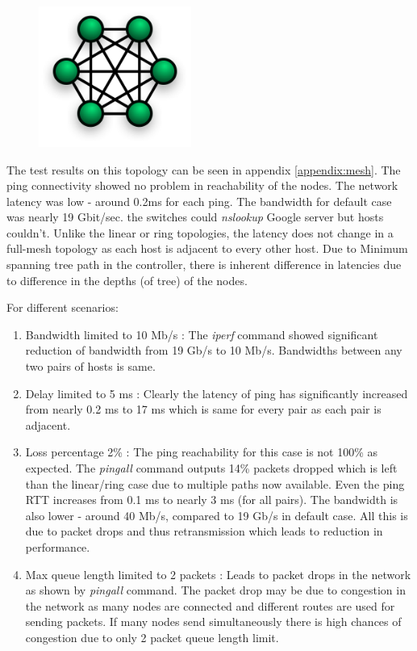 \documentclass[a4paper, 11pt]{article}
\begin{document}
\begin{figure}[h]
\centering %
\includegraphics[width=5cm]{mesh}
\end{figure}

The test results on this topology can be seen in appendix \ref{appendix:mesh}. The ping connectivity showed no problem in reachability of the nodes. The network latency was low - around 0.2ms for each ping. The bandwidth for default case was nearly 19 Gbit/sec. the switches could \textit{nslookup} Google server but hosts couldn't. Unlike the linear or ring topologies, the latency does not change in a full-mesh topology as each host is adjacent to every other host. Due to Minimum spanning tree path in the controller, there is inherent difference in latencies due to difference in the depths (of tree) of the nodes.

For different scenarios:
\begin{enumerate}
\item Bandwidth limited to 10 Mb/s : The \textit{iperf} command showed significant reduction of bandwidth from 19 Gb/s to 10 Mb/s. Bandwidths between any two pairs of hosts is same.
\item Delay limited to 5 ms : Clearly the latency of ping has significantly increased from nearly 0.2 ms to 17  ms which is same for every pair as each pair is adjacent.
\item Loss percentage 2\% : The ping reachability for this case is not 100\% as expected. The \textit{pingall} command outputs 14\% packets dropped which is left than the linear/ring case due to multiple paths now available. Even the ping RTT increases from 0.1 ms to nearly 3 ms (for all pairs). The bandwidth is also lower - around 40 Mb/s, compared to 19 Gb/s in default case. All this is due to packet drops and thus retransmission which leads to reduction in performance.
\item Max queue length limited to 2 packets : Leads to packet drops in the network as shown by \textit{pingall} command. The packet drop may be due to congestion in the network as many nodes are connected and different routes are used for sending packets. If many nodes send simultaneously there is high chances of congestion due to only 2 packet queue length limit.
\end{enumerate}
\end{document}
